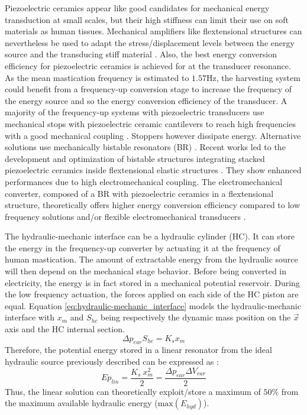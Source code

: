 \documentclass[3p,twocolumn,preprint]{elsarticle}
\begin{document}
Piezoelectric ceramics appear like good candidates for mechanical energy transduction at small scales, but their high stiffness can limit their use on soft materials as human tissues. Mechanical amplifiers like flextensional structures can nevertheless be used to adapt the stress/displacement levels between the energy source and the transducing stiff material \cite{Abdelnaby2016}. Also, the best energy conversion efficiency for piezoelectric ceramics is achieved for at the transducer resonance. As the mean mastication frequency is estimated to \mbox{$1.57$Hz}, the harvesting system could benefit from a frequency-up conversion stage \cite{Ashraf2011,Peng2021} to increase the frequency of the energy source and so the energy conversion efficiency of the transducer. A majority of the frequency-up systems with piezoelectric transducers use mechanical stops with piezoelectric ceramic cantilevers to reach high frequencies with a good mechanical coupling \cite{Edwards2013,Gu2011,Lee2007}. Stoppers however dissipate energy. Alternative solutions use mechanically bistable resonators (BR) \cite{Vocca2012}. Recent works led to the development and optimization of bistable structures integrating stacked piezoelectric ceramics inside flextensional elastic structures \cite{Huguet2017}. They show enhanced performances due to high electromechanical coupling. The electromechanical converter, composed of a BR with piezoelectric ceramics in a flextensional structure, theoretically offers higher energy conversion efficiency compared to low frequency solutions and/or flexible electromechanical transducers \cite{Abdelnaby2016,Peng2021}.

The hydraulic-mechanic interface can be a hydraulic cylinder (HC). It can store the energy in the frequency-up converter by actuating it at the frequency of human mastication. The amount of extractable energy from the hydraulic source will then depend on the mechanical stage behavior. Before being converted in electricity, the energy is in fact stored in a mechanical potential reservoir. During the low frequency actuation, the forces applied on each side of the HC piston are equal. Equation \ref{eq:hydraulic-mechanic_interface} models the hydraulic-mechanic interface with $x_{m}$ and $ S_{hc}$ being respectively the dynamic mass position on the $\vec{x}$ axis and the HC internal section. 
\begin{equation}
	\Delta p_{ear}S_{hc} = K_s x_m
	\label{eq:hydraulic-mechanic_interface}
\end{equation}
Therefore, the potential energy stored in a linear resonator from the ideal hydraulic source previously described can be expressed as :
\begin{equation}
	Ep_{lin} = \dfrac{K_s\ x_{m}^2}{2} = \dfrac{\Delta p_{ear} \Delta V_{ear}}{2}
	\label{eq:best_linear_soution}
\end{equation}
Thus, the linear solution can theoretically exploit/store a maximum of $50\%$ from the maximum available hydraulic energy ($\text{max}(E_{hyd})$). 
\end{document}
